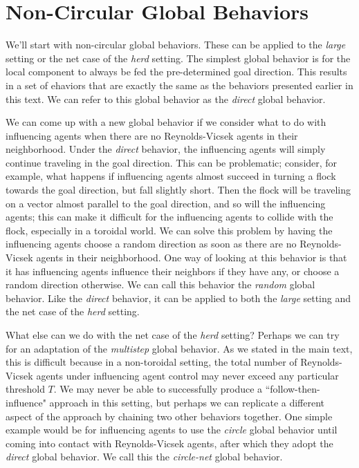 \section{Non-Circular Global Behaviors}
We'll start with non-circular global behaviors.
These can be applied to the \textit{large} setting or the net case of the
\textit{herd} setting.
The simplest global behavior is for the local component to always be fed the
pre-determined goal direction.
This results in a set of ehaviors that are exactly the same as the behaviors
presented earlier in this text.
We can refer to this global behavior as the \textit{direct} global behavior.

We can come up with a new global behavior if we consider what to do with
influencing agents when there are no Reynolds-Vicsek agents in their
neighborhood.
Under the \textit{direct} behavior, the influencing agents will simply continue
traveling in the goal direction.
This can be problematic; consider, for example, what happens if influencing
agents almost succeed in turning a flock towards the goal direction, but fall
slightly short.
Then the flock will be traveling on a vector almost parallel to the goal
direction, and so will the influencing agents; this can make it difficult for
the influencing agents to collide with the flock, especially in a toroidal
world.
We can solve this problem by having the influencing agents choose a random
direction as soon as there are no Reynolds-Vicsek agents in their neighborhood.
One way of looking at this behavior is that it has influencing agents influence
their neighbors if they have any, or choose a random direction otherwise.
We can call this behavior the \textit{random} global behavior.
Like the \textit{direct} behavior, it can be applied to both the \textit{large}
setting and the net case of the \textit{herd} setting.

What else can we do with the net case of the \textit{herd} setting?
Perhaps we can try for an adaptation of the \textit{multistep} global behavior.
As we stated in the main text, this is difficult because in a non-toroidal
setting, the total number of Reynolds-Vicsek agents under influencing agent
control may never exceed any particular threshold $T$.
We may never be able to successfully produce a ``follow-then-influence"
approach in this setting, but perhaps we can replicate a different aspect of
the approach by chaining two other behaviors together.
One simple example would be for influencing agents to use the \textit{circle}
global behavior until coming into contact with Reynolds-Vicsek agents, after
which they adopt the \textit{direct} global behavior.
We call this the \textit{circle-net} global behavior.

